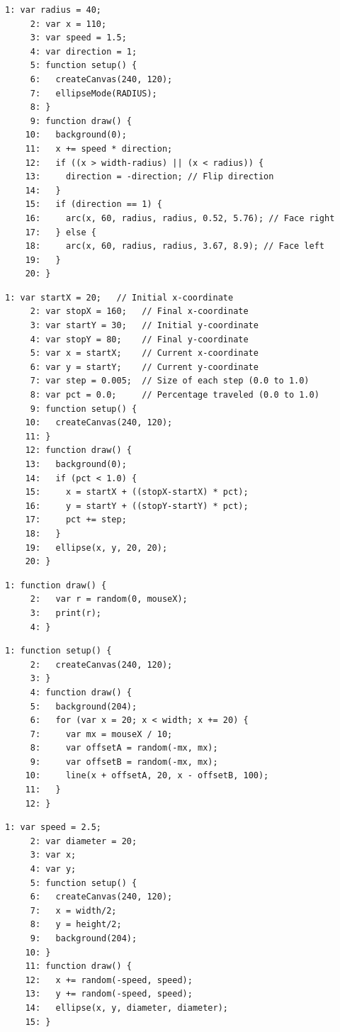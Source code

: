 \documentclass[a4j]{ltjsarticle}
\begin{document}
\begin{lstlisting}[caption=Ex\_08\_05.js]
     1: var radius = 40;
     2: var x = 110;
     3: var speed = 1.5;
     4: var direction = 1;
     5: function setup() {
     6:   createCanvas(240, 120);
     7:   ellipseMode(RADIUS);
     8: }
     9: function draw() {
    10:   background(0);
    11:   x += speed * direction;
    12:   if ((x > width-radius) || (x < radius)) {
    13:     direction = -direction; // Flip direction
    14:   }
    15:   if (direction == 1) {
    16:     arc(x, 60, radius, radius, 0.52, 5.76); // Face right
    17:   } else {
    18:     arc(x, 60, radius, radius, 3.67, 8.9); // Face left
    19:   }
    20: }
\end{lstlisting}
\vspace{1in}
\begin{lstlisting}[caption=Ex\_08\_06.js]
     1: var startX = 20;   // Initial x-coordinate
     2: var stopX = 160;   // Final x-coordinate
     3: var startY = 30;   // Initial y-coordinate
     4: var stopY = 80;    // Final y-coordinate
     5: var x = startX;    // Current x-coordinate
     6: var y = startY;    // Current y-coordinate
     7: var step = 0.005;  // Size of each step (0.0 to 1.0)
     8: var pct = 0.0;     // Percentage traveled (0.0 to 1.0)
     9: function setup() {
    10:   createCanvas(240, 120);
    11: }
    12: function draw() {
    13:   background(0);
    14:   if (pct < 1.0) {
    15:     x = startX + ((stopX-startX) * pct);
    16:     y = startY + ((stopY-startY) * pct);
    17:     pct += step;
    18:   }
    19:   ellipse(x, y, 20, 20);
    20: }
\end{lstlisting}
\vspace{1in}
\begin{lstlisting}[caption=Ex\_08\_07.js]
     1: function draw() {
     2:   var r = random(0, mouseX);
     3:   print(r);
     4: }
\end{lstlisting}
\vspace{1in}
\begin{lstlisting}[caption=Ex\_08\_08.js]
     1: function setup() {
     2:   createCanvas(240, 120);
     3: }
     4: function draw() {
     5:   background(204);
     6:   for (var x = 20; x < width; x += 20) {
     7:     var mx = mouseX / 10;
     8:     var offsetA = random(-mx, mx);
     9:     var offsetB = random(-mx, mx);
    10:     line(x + offsetA, 20, x - offsetB, 100);
    11:   }
    12: }
\end{lstlisting}
\vspace{1in}
\begin{lstlisting}[caption=Ex\_08\_09.js]
     1: var speed = 2.5;
     2: var diameter = 20;
     3: var x;
     4: var y;
     5: function setup() {
     6:   createCanvas(240, 120);
     7:   x = width/2;
     8:   y = height/2;
     9:   background(204);    
    10: }
    11: function draw() {
    12:   x += random(-speed, speed);
    13:   y += random(-speed, speed);
    14:   ellipse(x, y, diameter, diameter);
    15: }
\end{lstlisting}
\end{document}
